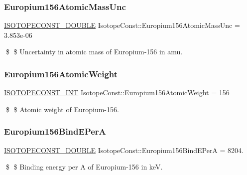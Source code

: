 \subsubsection{\texorpdfstring{Europium156\+Atomic\+Mass\+Unc}{Europium156AtomicMassUnc}}
{\footnotesize\ttfamily \mbox{\hyperlink{group___isotope_const-_macros_ga8f45a7272ce02c0b4c65c44636ed719a}{I\+S\+O\+T\+O\+P\+E\+C\+O\+N\+S\+T\+\_\+\+D\+O\+U\+B\+LE}} Isotope\+Const\+::\+Europium156\+Atomic\+Mass\+Unc = 3.\+853e-\/06}

\$ \$ Uncertainty in atomic mass of Europium-\/156 in amu. \mbox{\label{group___isotope_const-_europium-_eu156_gaf32ca63dcbc5211d1117de3a03aedd03}} 
\subsubsection{\texorpdfstring{Europium156\+Atomic\+Weight}{Europium156AtomicWeight}}
{\footnotesize\ttfamily \mbox{\hyperlink{group___isotope_const-_macros_ga5f18360b3e99483a35c32d789e62621c}{I\+S\+O\+T\+O\+P\+E\+C\+O\+N\+S\+T\+\_\+\+I\+NT}} Isotope\+Const\+::\+Europium156\+Atomic\+Weight = 156}

\$ \$ Atomic weight of Europium-\/156. \mbox{\label{group___isotope_const-_europium-_eu156_ga558dfb820778f32cf9480c0dd2360488}} 
\subsubsection{\texorpdfstring{Europium156\+Bind\+E\+PerA}{Europium156BindEPerA}}
{\footnotesize\ttfamily \mbox{\hyperlink{group___isotope_const-_macros_ga8f45a7272ce02c0b4c65c44636ed719a}{I\+S\+O\+T\+O\+P\+E\+C\+O\+N\+S\+T\+\_\+\+D\+O\+U\+B\+LE}} Isotope\+Const\+::\+Europium156\+Bind\+E\+PerA = 8204.}

\$ \$ Binding energy per A of Europium-\/156 in keV. \mbox{\label{group___isotope_const-_europium-_eu156_gabea683d510b699cb36346b1ea2a72c27}} 
